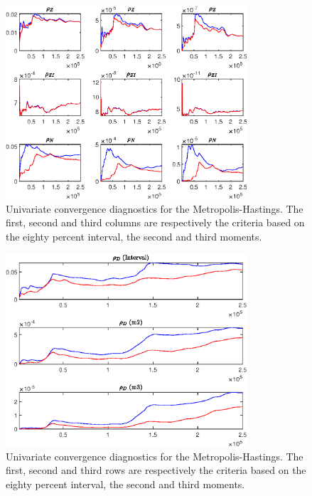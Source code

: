 \begin{figure}[H]
\centering 
\includegraphics[width=0.80\textwidth]{BRS_comovement/Output/BRS_comovement_udiag3}
\caption{Univariate convergence diagnostics for the Metropolis-Hastings.
The first, second and third columns are respectively the criteria based on
the eighty percent interval, the second and third moments.}\label{Fig:UnivariateDiagnostics:3}
\end{figure}

\begin{figure}[H]
\centering 
\includegraphics[width=0.80\textwidth]{BRS_comovement/Output/BRS_comovement_udiag4}
\caption{Univariate convergence diagnostics for the Metropolis-Hastings.
The first, second and third rows are respectively the criteria based on
the eighty percent interval, the second and third moments.}\label{Fig:UnivariateDiagnostics:4}
\end{figure}

